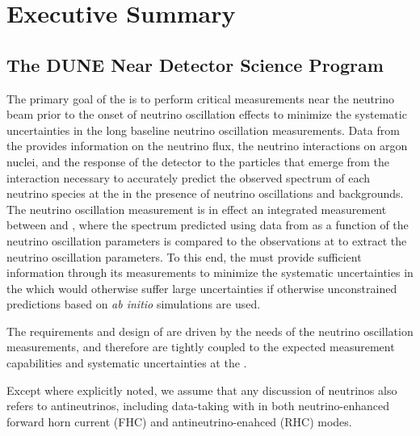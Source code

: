 \chapter{Executive Summary}
\label{ch:intro}


\section{The DUNE Near Detector Science Program}
\label{intro:science}
The primary goal of the  
 is to perform critical measurements near the  neutrino beam prior to the onset of neutrino oscillation effects to minimize the systematic uncertainties in  the long baseline neutrino oscillation measurements. Data from the  provides information on the neutrino flux, %
the neutrino interactions on argon nuclei, and the response of the detector to the particles that emerge from the interaction necessary to accurately predict the observed spectrum of each neutrino species at the 
in the presence of neutrino oscillations and backgrounds. The  %
neutrino oscillation measurement is in effect an integrated measurement between  and , where the  spectrum predicted using data from  as a function of the neutrino oscillation parameters is compared to the observations at  to extract the neutrino oscillation parameters. To this end, the  must provide sufficient information through its measurements to minimize the systematic uncertainties in the  which would otherwise suffer large uncertainties if otherwise unconstrained predictions based on {\em ab initio} simulations are used.

The requirements and design of  are driven by the needs of the  %
neutrino oscillation measurements, and therefore are tightly coupled to the  expected measurement capabilities and systematic uncertainties at the .

Except where explicitly noted, we assume that any discussion of neutrinos also refers to antineutrinos, including data-taking with  in both neutrino-enhanced forward horn current (FHC) and antineutrino-enahced (RHC) modes.

